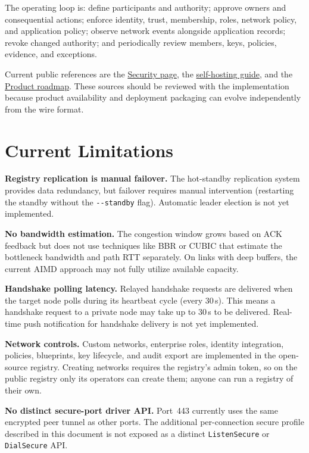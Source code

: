 \documentclass[11pt,a4paper]{article}
\begin{document}
The operating loop is: define participants and authority; approve owners and consequential actions; enforce identity, trust, membership, roles, network policy, and application policy; observe network events alongside application records; revoke changed authority; and periodically review members, keys, policies, evidence, and exceptions.

Current public references are the \href{https://pilotprotocol.network/security/}{Security page}, the \href{https://pilotprotocol.network/self-hosting/}{self-hosting guide}, and the \href{https://pilotprotocol.network/roadmap}{Product roadmap}. These sources should be reviewed with the implementation because product availability and deployment packaging can evolve independently from the wire format.

\section{Current Limitations}

\textbf{Registry replication is manual failover.} The hot-standby replication system provides data redundancy, but failover requires manual intervention (restarting the standby without the \texttt{-{}-standby} flag). Automatic leader election is not yet implemented.

\textbf{No bandwidth estimation.} The congestion window grows based on ACK feedback but does not use techniques like BBR or CUBIC that estimate the bottleneck bandwidth and path RTT separately. On links with deep buffers, the current AIMD approach may not fully utilize available capacity.

\textbf{Handshake polling latency.} Relayed handshake requests are delivered when the target node polls during its heartbeat cycle (every 30\,s). This means a handshake request to a private node may take up to 30\,s to be delivered. Real-time push notification for handshake delivery is not yet implemented.

\textbf{Network controls.} Custom networks, enterprise roles, identity integration, policies, blueprints, key lifecycle, and audit export are implemented in the open-source registry. Creating networks requires the registry's admin token, so on the public registry only its operators can create them; anyone can run a registry of their own.

\textbf{No distinct secure-port driver API.} Port~443 currently uses the same encrypted peer tunnel as other ports. The additional per-connection secure profile described in this document is not exposed as a distinct \texttt{ListenSecure} or \texttt{DialSecure} API.
\end{document}
